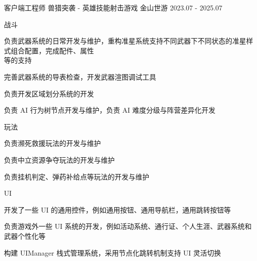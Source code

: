 

\begin{cventries}

\cventry
    {客户端工程师} %
    {兽猎突袭 -  英雄技能射击游戏} %
    {金山世游} %
    {2023.07 - 2025.07} %
    {
        \begin{cvitems}
            \item {战斗
                \begin{cvsubitems}
                    \item {负责武器系统的日常开发与维护，重构准星系统支持不同武器下不同状态的准星样式组合配置，完成配件、属性\\等的支持}
                    \item {完善武器系统的导表检查，开发武器渲图调试工具}
                    \item {负责开发区域划分系统的开发}
                    \item {负责 AI 行为树节点开发与维护，负责 AI 难度分级与阵营差异化开发}
                \end{cvsubitems}
            }
            \item {玩法
                \begin{cvsubitems}
                    \item {负责濒死救援玩法的开发与维护}
                    \item {负责中立资源争夺玩法的开发与维护}
                    \item {负责挂机判定、弹药补给点等玩法的开发与维护}
                \end{cvsubitems}
            }
            \item {UI
                \begin{cvsubitems}
                    \item {开发了一些 UI 的通用控件，例如通用按钮、通用导航栏，通用跳转按钮等}
                    \item {负责游戏外一些 UI 系统的开发，例如活动系统、通行证、个人生涯、武器系统和武器个性化等}
                    \item {构建 UIManager 栈式管理系统，采用节点化跳转机制支持 UI 灵活切换}

\end{cvsubitems}}
\end{cvitems}}
\end{cventries}
